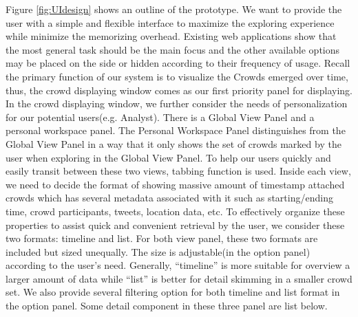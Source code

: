 \documentclass{sig-alternate}
\begin{document}
Figure \ref{fig:UIdesign} shows an outline of the prototype. We want to provide the user with a simple and flexible interface to maximize the exploring experience while minimize the memorizing overhead. Existing web applications show that the most general task should be the main focus and the other available options may be placed on the side or hidden according to their frequency of usage. Recall the primary function of our system is to visualize the Crowds emerged over time, thus, the crowd displaying window comes as our first priority panel for displaying. In the crowd displaying window, we further consider the needs of personalization for our potential users(e.g. Analyst). There is a Global View Panel and a personal workspace panel. The Personal Workspace Panel distinguishes from the Global View Panel in a way that it only shows the set of crowds marked by the user when exploring in the Global View Panel. To help our users quickly and easily transit between these two views, tabbing function is used. Inside each view, we need to decide the format of showing massive amount of timestamp attached crowds which has several metadata associated with it such as starting/ending time, crowd participants, tweets, location data, etc. To effectively organize these properties to assist quick and convenient retrieval by the user, we consider these two formats: timeline and list. For both view panel, these two formats are included but sized unequally. The size is adjustable(in the option panel) according to the user's need. Generally, ``timeline'' is more suitable for overview a larger amount of data while ``list'' is better for detail skimming in a smaller crowd set. We also provide several filtering option for both timeline and list format in the option panel. Some detail component in these three panel are list below.
\end{document}
